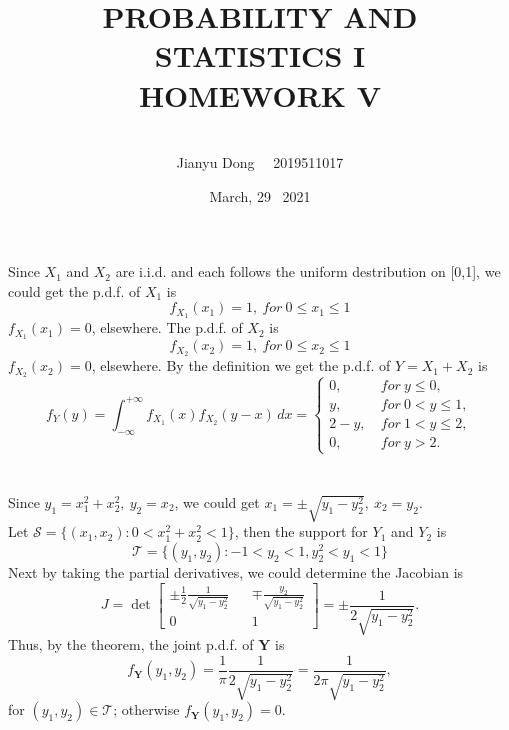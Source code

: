 \documentclass[10.5pt]{article}
\title{PROBABILITY AND STATISTICS I
\\HOMEWORK V}
\author{\\Jianyu Dong   ~~2019511017}
\date{March, 29~ 2021}
\begin{document}
    
\maketitle
\newpage

\section{}
Since $X_1$ and $X_2$ are i.i.d. and each follows the uniform destribution on [0,1], we could get the p.d.f. of $X_1$ is $$f_{X_1}(x_1) = 1, ~for ~0\leqslant x_1 \leqslant 1$$ $f_{X_1}(x_1) = 0$, elsewhere. The p.d.f. of $X_2$ is $$f_{X_2}(x_2) = 1, ~for ~0\leqslant x_2 \leqslant 1$$ $f_{X_2}(x_2) = 0$, elsewhere.\indent
By the definition we get the p.d.f. of $Y = X_1 + X_2$ is $$f_Y(y) = \int_{-\infty}^{+\infty} f_{X_1}(x) f_{X_2}(y-x) \,dx = \begin{cases}
    0, & ~for ~y\leqslant 0,\\
    y, & ~for ~0<y\leqslant 1,\\
    2-y, & ~for ~1<y\leqslant 2,\\
    0, & ~for ~y>2.
\end{cases}$$

\section{}
Since $y_1 = x_1^2 + x_2^2,~y_2 = x_2$, we could get $x_1 = \pm \sqrt{y_1 - y_2^2},~x_2 = y_2$. \\\indent
Let $\mathcal{S} = \{(x_1,x_2):0<x_1^2+x_2^2<1\}$, then the support for $Y_1$ and $Y_2$ is $$\mathcal{T} = \{(y_1,y_2):-1<y_2<1,y_2^2<y_1 <1\}$$ \indent
Next by taking the partial derivatives, we could determine the Jacobian is $$J = \det\begin{bmatrix}
    \pm \frac{1}{2}\frac{1}{\sqrt{y_1-y_2^2}} & & \mp \frac{y_2}{\sqrt{y_1-y_2^2}}\\
    0 & & 1
\end{bmatrix} = \pm \frac{1}{2\sqrt{y_1-y_2^2}}.$$\indent
Thus, by the theorem, the joint p.d.f. of $\mathbf{Y}$ is $$f_\mathbf{Y}(y_1,y_2) = \frac{1}{\pi}\frac{1}{2\sqrt{y_1-y_2^2}} = \frac{1}{2\pi\sqrt{y_1-y_2^2}},$$\indent for $(y_1,y_2) \in \mathcal{T}$; otherwise $f_\mathbf{Y}(y_1,y_2) = 0$.
\end{document}
